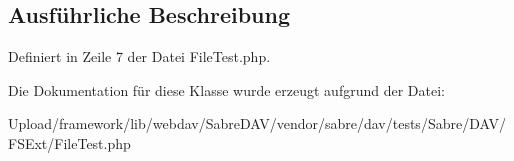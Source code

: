 \subsection{Ausführliche Beschreibung}


Definiert in Zeile 7 der Datei File\+Test.\+php.



Die Dokumentation für diese Klasse wurde erzeugt aufgrund der Datei\+:\begin{DoxyCompactItemize}
\item 
Upload/framework/lib/webdav/\+Sabre\+D\+A\+V/vendor/sabre/dav/tests/\+Sabre/\+D\+A\+V/\+F\+S\+Ext/File\+Test.\+php\end{DoxyCompactItemize}
